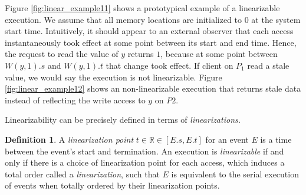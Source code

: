 \documentclass[]             %
{NASA}                       %
\theoremstyle{definition}
\newtheorem{definition}{Definition}[section]
\begin{document}
Figure \ref{fig:linear_example11} shows a prototypical example of a
linearizable execution. We assume that all memory locations are
initialized to \(0\) at the system start time. Intuitively, it should
appear to an external observer that each access instantaneously took
effect at some point between its start and end time. Hence, the request
to read the value of \(y\) returns \(1\), because at some point between
\(W(y,1).s\) and \(W(y,1).t\) that change took effect. If client on
\(P_1\) read a stale value, we would say the execution is not
linearizable. Figure \ref{fig:linear_example12} shows an
non-linearizable execution that returns stale data instead of reflecting
the write access to \(y\) on \(P2\).

Linearizability can be precisely defined in terms of
\emph{linearizations.}

\begin{definition}
  A \emph{linearization point} $t \in \mathbb{R} \in [E.s, E.t]$ for an
  event $E$ is a time between the event's start and termination. An
  execution is \emph{linearizable} if and only if there is a choice of
  linearization point for each access, which induces a total order called a \emph{linearization},
  such that $E$ is equivalent to
  the serial execution of events when totally ordered by their
  linearization points.
\end{definition}
\end{document}
